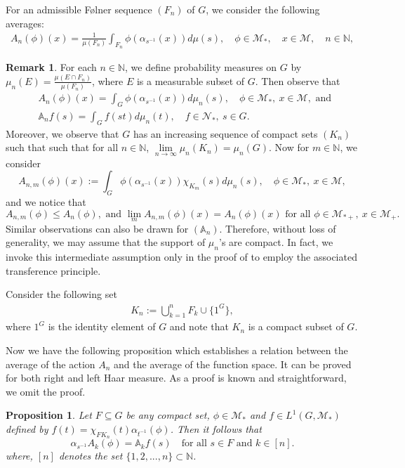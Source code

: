 \documentclass[11pt]{amsart}
\newtheorem{prop}[thm]{Proposition}
\theoremstyle{definition}
\theoremstyle{myremark}
\newtheorem{rem}[thm]{Remark}
\numberwithin{equation}{section}
\def\A{\mathbb A}
\def\N{\mathbb N}
\newcommand{\CM}{\mathcal{M}}
\newcommand{\CN}{\mathcal{N}}
\begin{document}
\noindent For an admissible F\o lner sequence $(F_n)$ of $G$,  
we consider  the following averages: 
\begin{align*}
	A_n(\phi)(x)= \frac{1}{\mu(F_n)}\int_{ F_n} \phi(\alpha_{s^{-1}}(x)) d\mu(s), \quad \phi \in \CM_*, \quad x \in \CM, \quad n \in \N,
\end{align*}


\begin{rem}\label{comp supp meas}
    For each $n \in \N$, we define probability measures on $G$ by $\mu_n(E)= \frac{\mu(E \cap F_{n})}{\mu(F_{n})}$, where $E$ is a measurable subset of $G$. Then observe that 
    \begin{align*}
& A_n(\phi)(x)= \int_{G}  \phi(\alpha_{s^{-1}}(x)) d\mu_n(s), \quad \phi \in \CM_*, ~x \in \CM, 
\text{ and } \\
    &\A_nf(s)= \int_{G} f(st) d\mu_n(t), \quad f \in \CN_*,~ s \in G.
\end{align*}
Moreover, we observe that $G$ has an increasing sequence of compact sets $( K_n )$ such that   such that for all $n \in \N$, $\underset{ n \to \infty }{ \lim} \mu_n(K_n)= \mu_n(G)$. 
Now for $m \in \N$, we consider 
 \[
    A_{n,m}(\phi)(x):= \int_{G}  \phi(\alpha_{s^{-1}}(x)) \chi_{K_m}(s) d\mu_n(s), \quad \phi \in \CM_*, ~x \in \CM,
    \]
and we notice that 
    \[
    A_{n,m}(\phi) \leq A_n(\phi), \text{ and } \lim_m A_{n,m}(\phi)(x)= A_n(\phi)(x) \text{ for all } \phi \in \CM_{*+}, ~x \in \CM_+.
    \]
    Similar observations can also be drawn for $(\A_n)$. Therefore, without loss of generality, we may assume that the support of $\mu_n$'s are compact.  In fact, we invoke this intermediate assumption only in the proof of  to employ the associated transference principle.
  
    
\end{rem}





Consider the following set 
	\begin{align}\label{compacttset}
	    K_n := \bigcup_{k=1}^{n} F_k \cup \{ 1^G\}, 
		\end{align}
where $1^G$ is the identity element of $G$ and note that  $K_n$	is a compact subset of $G$. 


Now we have the following proposition which establishes a relation between the average of the action $A_n$ and the average of the function space. It can be proved for both right and left Haar measure. As a proof  is known and straightforward, we omit the proof.
\begin{prop} Let $ F\subseteq G$ be any compact set,  $ \phi \in \CM_* $ and $f \in L^1(G, \CM_*)$ defined by  $ f(t)=  \chi_{ F K_n}(t) 
 \alpha_{t^{-1}}(\phi)$. Then it follows that 
  $$
\alpha_{s^{-1}} A_k(\phi) = \A_k f(s) \quad \text{for all } s \in F \text{ and } k \in [n]. 
    $$
where, $[n]$ denotes the set $\{1,2,...,n\} \subset \mathbb{N}$.
\end{prop}               
\end{document}

